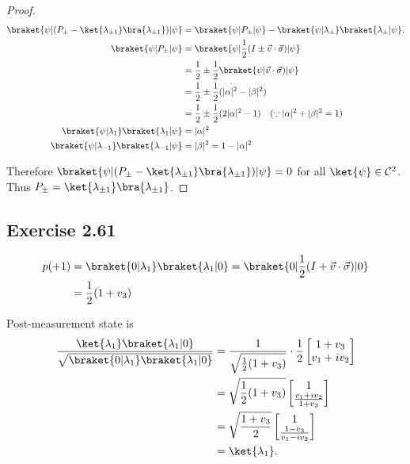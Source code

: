 \documentclass[a4paper,12pt]{article}
\begin{document}
\begin{proof}
		\begin{align*}
		\braket{\psi| (P_{\pm} - \ket{\lambda_{\pm 1}}\bra{\lambda_{\pm 1}}) |\psi}
		&= \braket{\psi | P_\pm | \psi} - \braket{\psi | \lambda_\pm} \braket{\lambda_\pm | \psi}.\\
		\braket{\psi | P_\pm | \psi} &= \braket{\psi | \frac{1}{2}(I \pm \vec{v} \cdot \vec{\sigma}) | \psi}\\
		&= \frac{1}{2} \pm \frac{1}{2} \braket{\psi | \vec{v} \cdot \vec{\sigma})| \psi}\\
		&= \frac{1}{2} \pm \frac{1}{2} (|\alpha|^2 - |\beta|^2)\\
		&= \frac{1}{2} \pm \frac{1}{2} (2|\alpha|^2 - 1) ~~~(\because |\alpha|^2 + |\beta|^2 = 1)\\
		\braket{\psi | \lambda_1} \braket{\lambda_1 | \psi} &= |\alpha|^2\\
		\braket{\psi | \lambda_{-1}} \braket{\lambda_{-1}| \psi} &= |\beta|^2 = 1  - |\alpha|^2
		\end{align*}

		Therefore $\braket{\psi | (P_\pm - \ket{\lambda_{\pm 1}}\bra{\lambda_{\pm 1}})| \psi} = 0$ for all $\ket{\psi} \in \mathcal{C}^2$.
		Thus $P_\pm = \ket{\lambda_{\pm 1}}\bra{\lambda_{\pm 1}}$.
	\end{proof}

\subsection*{Exercise 2.61}
\begin{align*}
	 p(+1)&=\braket{0 | \lambda_1} \braket{\lambda_1 | 0}
		= \braket{0 | \frac{1}{2} ( I + \vec{v} \cdot \vec{\sigma} ) | 0}\\
		&= \frac{1}{2} (1 + v_3)
\end{align*}

Post-measurement state is
\begin{align*}
	\frac{\ket{\lambda_1} \braket{\lambda_1 | 0}}{ \sqrt{\braket{0 | \lambda_1} \braket{\lambda_1 | 0}} } &= \frac{1}{\sqrt{\frac{1}{2} (1 + v_3)}}
	\cdot \frac{1}{2}
	\begin{bmatrix}
		1 + v_3 \\
		v_1 + iv_2
	\end{bmatrix} \\
		&= \sqrt{ \frac{1}{2}  (1 + v_3) } \begin{bmatrix}
		1 \\
		\frac{v_1 + iv_2}{1+v_3}
		\end{bmatrix} \\
		&=  \sqrt{ \frac{1 + v_3}{2} } \begin{bmatrix}
		1 \\
		\frac{1 - v_3}{v_1 - iv_2}
		\end{bmatrix} \\
		&= \ket{\lambda_1}.
\end{align*}
\end{document}

